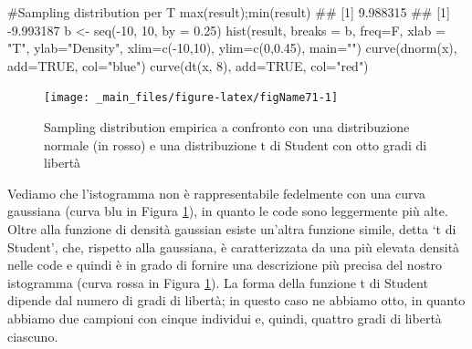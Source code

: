 \documentclass[a4paper,12pt,oneside]{book}
\newenvironment{Shaded}{\begin{snugshade}}{\end{snugshade}}
\newcommand{\DecValTok}[1]{#1}
\newcommand{\FloatTok}[1]{#1}
\newcommand{\ConstantTok}[1]{#1}
\newcommand{\SpecialCharTok}[1]{#1}
\newcommand{\StringTok}[1]{#1}
\newcommand{\CommentTok}[1]{#1}
\newcommand{\DocumentationTok}[1]{#1}
\newcommand{\OtherTok}[1]{#1}
\newcommand{\FunctionTok}[1]{#1}
\newcommand{\AttributeTok}[1]{#1}
\newcommand{\NormalTok}[1]{#1}
\begin{document}
\begin{Shaded}
\begin{Highlighting}[]
\CommentTok{\#Sampling distribution per T }
\FunctionTok{max}\NormalTok{(result);}\FunctionTok{min}\NormalTok{(result)}
\DocumentationTok{\#\# [1] 9.988315}
\DocumentationTok{\#\# [1] {-}9.993187}
\NormalTok{b }\OtherTok{\textless{}{-}} \FunctionTok{seq}\NormalTok{(}\SpecialCharTok{{-}}\DecValTok{10}\NormalTok{, }\DecValTok{10}\NormalTok{, }\AttributeTok{by =} \FloatTok{0.25}\NormalTok{)}
\FunctionTok{hist}\NormalTok{(result, }\AttributeTok{breaks =}\NormalTok{ b, }\AttributeTok{freq=}\NormalTok{F, }
  \AttributeTok{xlab =} \StringTok{"T"}\NormalTok{, }\AttributeTok{ylab=}\StringTok{"Density"}\NormalTok{, }
  \AttributeTok{xlim=}\FunctionTok{c}\NormalTok{(}\SpecialCharTok{{-}}\DecValTok{10}\NormalTok{,}\DecValTok{10}\NormalTok{), }\AttributeTok{ylim=}\FunctionTok{c}\NormalTok{(}\DecValTok{0}\NormalTok{,}\FloatTok{0.45}\NormalTok{), }\AttributeTok{main=}\StringTok{""}\NormalTok{)}
\FunctionTok{curve}\NormalTok{(}\FunctionTok{dnorm}\NormalTok{(x), }\AttributeTok{add=}\ConstantTok{TRUE}\NormalTok{, }\AttributeTok{col=}\StringTok{"blue"}\NormalTok{)}
\FunctionTok{curve}\NormalTok{(}\FunctionTok{dt}\NormalTok{(x, }\DecValTok{8}\NormalTok{), }\AttributeTok{add=}\ConstantTok{TRUE}\NormalTok{, }\AttributeTok{col=}\StringTok{"red"}\NormalTok{)}
\end{Highlighting}
\end{Shaded}

\begin{figure}

{\centering \texttt{[image: \_main\_files/figure-latex/figName71-1]} 

}

\caption{Sampling distribution empirica a confronto con una distribuzione normale (in rosso) e una distribuzione t di Student con otto gradi di libertà}\label{fig:figName71}
\end{figure}

Vediamo che l'istogramma non è rappresentabile fedelmente con una curva gaussiana (curva blu in Figura \ref{fig:figName71}), in quanto le code sono leggermente più alte. Oltre alla funzione di densità gaussian esiste un'altra funzione simile, detta `t di Student', che, rispetto alla gaussiana, è caratterizzata da una più elevata densità nelle code e quindi è in grado di fornire una descrizione più precisa del nostro istogramma (curva rossa in Figura \ref{fig:figName71}). La forma della funzione t di Student dipende dal numero di gradi di libertà; in questo caso ne abbiamo otto, in quanto abbiamo due campioni con cinque individui e, quindi, quattro gradi di libertà ciascuno.
\end{document}
